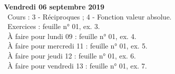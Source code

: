\documentclass[12pt,a4paper]{article}
\begin{document}
% 
% 
% 
%     
% 
% 
\noindent\textbf{Vendredi 06 septembre 2019}\\
\bu\ Cours : 3 - Réciproques ; 4 - Fonction valeur absolue.\\
\bu\ Exercices : feuille n° 01, ex. 3.\\
\bu\ À faire pour lundi 09 : feuille n° 01, ex. 4.\\
\bu\ À faire pour mercredi 11 : feuille n° 01, ex. 5.\\
\bu\ À faire pour jeudi 12 : feuille n° 01, ex. 6.\\
\bu\ À faire pour vendredi 13 : feuille n° 01, ex. 7.\vspace{.4cm}\\
 
\end{document}
